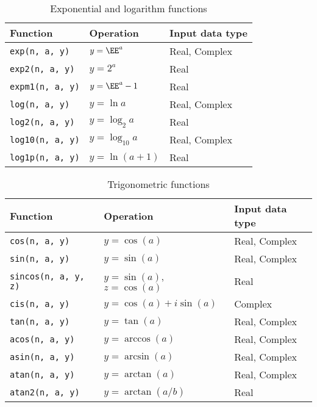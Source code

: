 \begin{table}
  \begin{tabularx}{\textwidth}{LLL}
    \toprule
    Function & Operation & Input data type \\
    \midrule
    \texttt{exp(n, a, y)}   & $y = \EE^a$       & Real, Complex \\
    \texttt{exp2(n, a, y)}  & $y = 2^a$         & Real          \\
    \texttt{expm1(n, a, y)} & $y = \EE^a - 1$   & Real          \\
    \texttt{log(n, a, y)}   & $y = \ln a$       & Real, Complex \\
    \texttt{log2(n, a, y)}  & $y = \log_2 a$    & Real          \\
    \texttt{log10(n, a, y)} & $y = \log_{10} a$ & Real, Complex \\
    \texttt{log1p(n, a, y)} & $y = \ln(a + 1)$  & Real          \\
    \bottomrule
  \end{tabularx}
  \caption{Exponential and logarithm functions}
  \label{tab:Exponential and logarithm functions}
\end{table}

\begin{table}
  \begin{tabularx}{\textwidth}{LLL}
    \toprule
    Function & Operation & Input data type \\
    \midrule
    \texttt{cos(n, a, y)}       & $y = \cos(a)$        & Real, Complex \\
    \texttt{sin(n, a, y)}       & $y = \sin(a)$        & Real, Complex \\
    \texttt{sincos(n, a, y, z)} & $y = \sin(a)$, $z = \cos(a)$ & Real  \\
    \texttt{cis(n, a, y)}       & $y = \cos(a) + i\sin(a)$   & Complex \\
    \texttt{tan(n, a, y)}       & $y = \tan(a)$        & Real, Complex \\
    \texttt{acos(n, a, y)}      & $y = \arccos(a)$     & Real, Complex \\
    \texttt{asin(n, a, y)}      & $y = \arcsin(a)$     & Real, Complex \\
    \texttt{atan(n, a, y)}      & $y = \arctan(a)$     & Real, Complex \\
    \texttt{atan2(n, a, y)}     & $y = \arctan(a / b)$ & Real          \\
    \bottomrule
  \end{tabularx}
  \caption{Trigonometric functions}
  \label{tab:Trigonometric functions}
\end{table}

